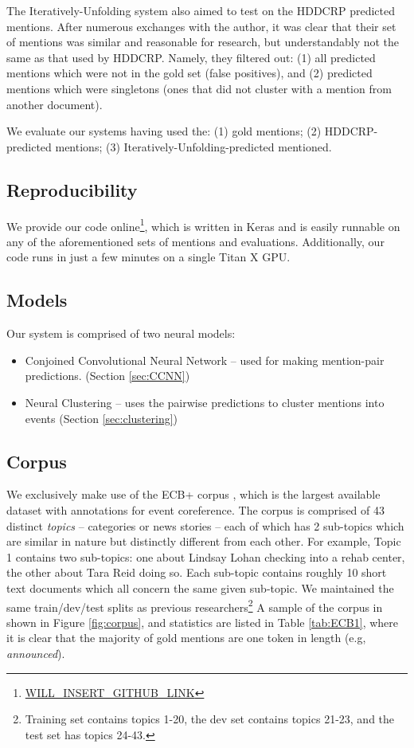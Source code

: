 \documentclass[11pt,a4paper]{article}
\begin{document}
The Iteratively-Unfolding system also aimed to test on the HDDCRP predicted mentions.  After numerous exchanges with the author, it was clear that their set of mentions was similar and reasonable for research, but understandably not the same as that used by HDDCRP.  Namely, they filtered out: (1) all predicted mentions which were not in the gold set (false positives), and (2) predicted mentions which were singletons (ones that did not cluster with a mention from another document).

We evaluate our systems having used the: (1) gold mentions; (2) HDDCRP-predicted mentions; (3) Iteratively-Unfolding-predicted mentioned.

\subsection{Reproducibility}
We provide our code online\footnote{\url{WILL_INSERT_GITHUB_LINK}}, which is written in Keras \cite{chollet2015} and is easily runnable on any of the aforementioned sets of mentions and evaluations.  Additionally, our code runs in just a few minutes on a single Titan X GPU.
\subsection{Models}
Our system is comprised of two neural models:
\begin{itemize}
  \item Conjoined Convolutional Neural Network -- used for making mention-pair predictions.  (Section \ref{sec:CCNN})
  \item Neural Clustering -- uses the pairwise predictions to cluster mentions into events (Section \ref{sec:clustering})
\end{itemize}
\subsection{Corpus}
\label{sec:corpus}
We exclusively make use of the ECB+ corpus \cite{ECB+}, which is the largest available dataset with annotations for event coreference.  The corpus is comprised of 43 distinct \textit{topics} -- categories or news stories -- each of which has 2 sub-topics which are similar in nature but distinctly different from each other.  For example, Topic 1 contains two sub-topics: one about Lindsay Lohan checking into a rehab center, the other about Tara Reid doing so.  Each sub-topic contains roughly 10 short text documents which all concern the same given sub-topic.  We maintained the same train/dev/test splits as previous researchers\footnote{Training set contains topics 1-20, the dev set contains topics 21-23, and the test set has topics 24-43.}  A sample of the corpus in shown in Figure \ref{fig:corpus}, and statistics are listed in Table \ref{tab:ECB1}, where it is clear that the majority of gold mentions are one token in length (e.g, \textit{announced}).
\end{document}
